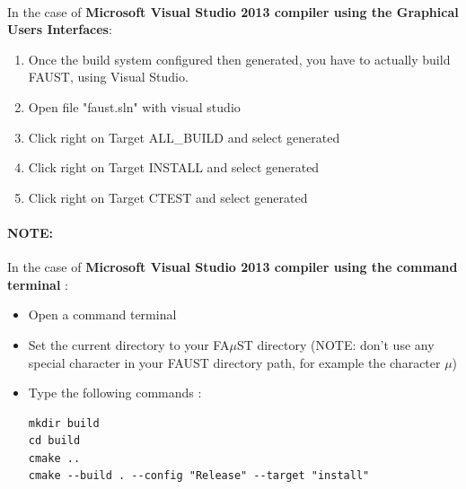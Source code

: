 \paragraph{}In the case of \textbf{Microsoft Visual Studio 2013 compiler using the Graphical Users Interfaces}:

\begin{enumerate}
\item Once the build system configured then generated, you have to actually build FAUST, using Visual Studio.
\item Open file "faust.sln" with visual studio 
\item Click right on Target ALL\_BUILD and select generated 
\item Click right on Target INSTALL and select generated 
\item Click right on Target CTEST and select generated 
\end{enumerate}


\bigbreak
\paragraph{NOTE:}In the case of \textbf{Microsoft Visual Studio 2013 compiler using the command terminal} :

\begin{itemize}
\item Open a command terminal
\item Set the current directory to your FA$\mu$ST directory (NOTE: don't use any special character in your FAUST directory path, for example the character $\mu$)
\item Type the following commands : 

\begin{lstlisting}
mkdir build
cd build
cmake .. 
cmake --build . --config "Release" --target "install"
\end{lstlisting}

\end{itemize}



